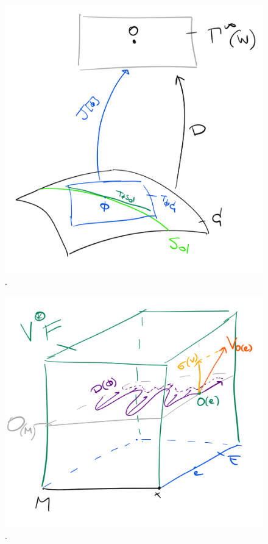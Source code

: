\documentclass[12pt]{article}
\begin{document}
\begin{figure}
  \centering
  \includegraphics{Pictures/jacobi.png}
  \caption{.}
\end{figure}

\begin{figure}
  \centering
  \includegraphics{Pictures/fieldJacobi.png}
  \caption{.}
\end{figure}
\end{document}
